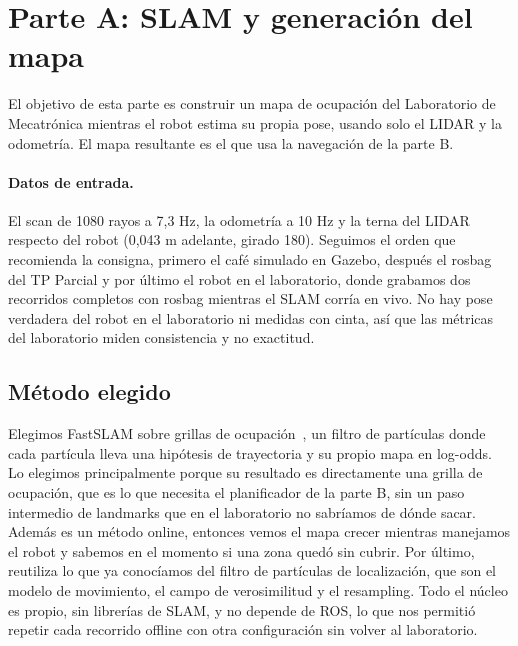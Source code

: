 
\section{Parte A: SLAM y generación del mapa}

El objetivo de esta parte es construir un mapa de ocupación del Laboratorio de
Mecatrónica mientras el robot estima su propia pose, usando solo el LIDAR y la
odometría. El mapa resultante es el que usa la navegación de la parte B.

\paragraph{Datos de entrada.} El scan  de 1080 rayos a 7,3 Hz, la
odometría  a 10 Hz y la terna del LIDAR respecto del robot (0,043 m
adelante, girado 180\textdegree). Seguimos el orden que recomienda la consigna,
primero el café simulado en Gazebo, después el rosbag del TP Parcial y por
último el robot en el laboratorio, donde grabamos dos recorridos completos con
rosbag mientras el SLAM corría en vivo. No hay pose verdadera del robot en el
laboratorio ni medidas con cinta, así que las métricas del laboratorio miden
consistencia y no exactitud.

\subsection{Método elegido}

Elegimos FastSLAM sobre grillas de ocupación~\cite{thrun,fastslam,gmapping}, un
filtro de partículas donde cada partícula lleva una hipótesis de trayectoria y
su propio mapa en log-odds. Lo elegimos principalmente porque su resultado es
directamente una grilla de ocupación, que es lo que necesita el planificador de
la parte B, sin un paso intermedio de landmarks que en el laboratorio no
sabríamos de dónde sacar. Además es un método online, entonces vemos el mapa
crecer mientras manejamos el robot y sabemos en el momento si una zona quedó
sin cubrir. Por último, reutiliza lo que ya conocíamos del filtro de partículas
de localización, que son el modelo de movimiento, el campo de verosimilitud y
el resampling. Todo el núcleo es propio, sin librerías de SLAM, y no depende de
ROS, lo que nos permitió repetir cada recorrido offline con otra configuración
sin volver al laboratorio.

